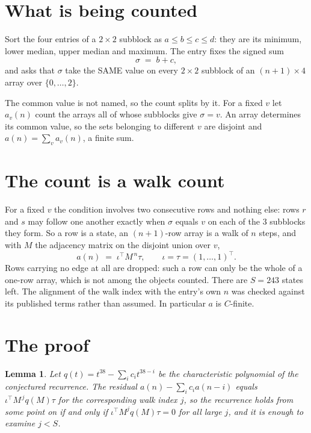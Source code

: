 \documentclass[11pt,a4paper]{article}
\theoremstyle{plain}
\newtheorem{lemma}[theorem]{Lemma}
\theoremstyle{definition}
\begin{document}
\section{What is being counted}

Sort the four entries of a $2\times2$ subblock as $a\le b\le c\le d$: they
are its minimum, lower median, upper median and maximum. The entry fixes the signed sum
\[
\sigma\;=\;b+c,
\]
and asks that $\sigma$ take the SAME value on every $2\times2$ subblock of an
$(n+1)\times4$ array over $\{0,\dots,2\}$.

The common value is not named, so the count splits by it. For a fixed $v$ let $a_v(n)$ count
the arrays all of whose subblocks give $\sigma=v$. An array determines its common value, so
the sets belonging to different $v$ are disjoint and $a(n)=\sum_v a_v(n)$, a finite sum.


\section{The count is a walk count}

For a fixed $v$ the condition involves two consecutive rows and nothing
else: rows $r$ and $s$ may follow one another exactly when $\sigma$ equals $v$ on each of the
$3$ subblocks they form. So a row is a state, an $(n+1)$-row array is a walk of $n$
steps, and with $M$ the adjacency matrix on the disjoint union over $v$,
\[
a(n)\;=\;\iota^{\!\top}M^{\,n}\tau,\qquad\iota=\tau=(1,\dots,1)^{\!\top} .
\]
Rows carrying no edge at all are dropped: such a row can only be the whole of a one-row
array, which is not among the objects counted. There are $S=243$ states left.
The alignment of the walk index with the entry's own $n$ was checked against its published
terms rather than assumed. In particular $a$ is $C$-finite.

\section{The proof}

\begin{lemma}\label{lem:crit}
Let $q(t)=t^{38}-\sum_i c_it^{38-i}$ be the characteristic polynomial of the
conjectured recurrence. The residual $a(n)-\sum_ic_ia(n-i)$ equals
$\iota^{\!\top}M^{\,j}q(M)\tau$ for the corresponding walk index $j$, so the recurrence
holds from some point on if and only if $\iota^{\!\top}M^{j}q(M)\tau=0$ for all large $j$,
and it is enough to examine $j<S$.
\end{lemma}
\end{document}
